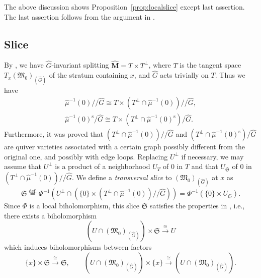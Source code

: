 \documentclass[12pt]{amsart}
\def\frak{\mathfrak}
\theoremstyle{definition}
\theoremstyle{remark}
\numberwithin{equation}{subsection}
\newcommand{\propref}[1]{Proposition~\ref{#1}}
\newcommand{\defeq}{\overset{\operatorname{\scriptstyle def.}}{=}}
\newcommand{\bM}{{\mathbf M}} %
\newcommand{\M}{{\frak M}} %
\newcommand{\dslash}{/\!\!/} %
\begin{document}
The above discussion shows \propref{prop:localslice} except last
assertion.  The last assertion follows from the argument in
\cite[p.386]{SL}.

\subsection{Slice}\label{subsec:slice}
By \cite[p.391]{Na-quiver}, we have $\widehat G$-invariant splitting 
$\widehat\bM = T\times T^\perp$, where $T$ is the tangent space
$T_x(\M_0)_{(\widehat G)}$ of the stratum containing $x$, and
$\widehat G$ acts trivially on $T$. Thus we have
\begin{gather*}
   {\widehat\mu}^{-1}(0)\dslash \widehat G
    \cong
    T \times \left(T^\perp\cap \widehat\mu^{-1}(0)\right)
         \dslash \widehat G, \\
   {\widehat\mu}^{-1}(0)^{\operatorname{s}}/\widehat G
    \cong
    T \times \left(T^\perp\cap
    \widehat\mu^{-1}(0)^{\operatorname{s}}\right)/ \widehat G.
\end{gather*}
Furthermore, it was proved that
\(
    \left(T^\perp\cap \widehat\mu^{-1}(0)\right) \dslash \widehat G
\)
and
\(
    \left(T^\perp\cap
    \widehat\mu^{-1}(0)^{\operatorname{s}}\right)/ \widehat G
\)
are quiver varieties associated with a certain graph possibly
different from the original one, and possibly with edge loops.
%
Replacing $U^\perp$ if necessary, we may assume that $U^\perp$ is a
product of a neighborhood $U_T$ of $0$ in $T$ and that $U_{\mathfrak
S}$ of $0$ in
\(
    \left(T^\perp\cap \widehat\mu^{-1}(0)\right) \dslash \widehat G.
\)
%
We define a {\it transversal slice\/} to $(\M_0)_{(\widehat G)}$ at
$x$ as
\begin{equation*}
   \mathfrak S \defeq
   \Phi^{-1}\left(U^\perp\cap \left(\{ 0\} \times 
     \left(T^\perp\cap \widehat\mu^{-1}(0)\right) \dslash \widehat G
   \right)\right)
   = \Phi^{-1}\left(\{0\}\times U_{\mathfrak S}\right).
\end{equation*}
Since $\Phi$ is a local biholomorphism, this slice $\mathfrak S$
satisfies the properties in \cite[3.2.19]{Gi-book}, i.e.,
there exists a biholomorphism
\begin{equation*}
   \left(U\cap (\M_0)_{(\widehat G)}\right)\times \mathfrak S
    \xrightarrow{\cong} U
\end{equation*}
which induces biholomorphisms between factors
\begin{equation*}
   \{ x\} \times \mathfrak S \xrightarrow{\cong} \mathfrak S, \qquad
%
   \left(U\cap (\M_0)_{(\widehat G)}\right)\times \{x\}
    \xrightarrow{\cong} \left(U\cap (\M_0)_{(\widehat G)}\right).
\end{equation*}
\end{document}

